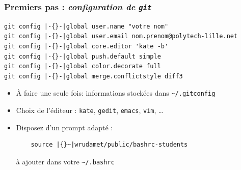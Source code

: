 \documentclass[table,tikz,12pt,svgnames]{beamer}
\begin{document}
\begin{frame}[fragile]
\frametitle{Premiers pas : \textit{configuration de \texttt{git}}}
\begin{adjustwidth}{0em}{0cm}{}
\begin{verbatim}
git config |-{}-|global user.name "votre nom"
git config |-{}-|global user.email nom.prenom@polytech-lille.net
git config |-{}-|global core.editor 'kate -b'
git config |-{}-|global push.default simple
git config |-{}-|global color.decorate full
git config |-{}-|global merge.conflictstyle diff3
\end{verbatim}

\end{adjustwidth}
\vspace{-1em}
\begin{block}{}
\begin{itemize}
\item À faire une seule fois: informations stockées dans \texttt{\textasciitilde/.gitconfig}
\item Choix de l'éditeur : \texttt{kate}, \texttt{gedit}, \texttt{emacs}, \texttt{vim}, \ldots
\item Disposez d'un prompt adapté :
\begin{verbatim}
	source |{}~|wrudamet/public/bashrc-students
\end{verbatim}
\small à ajouter dans votre \texttt{\textasciitilde/.bashrc}
\end{itemize}
\end{block}

\end{frame}
\end{document}
